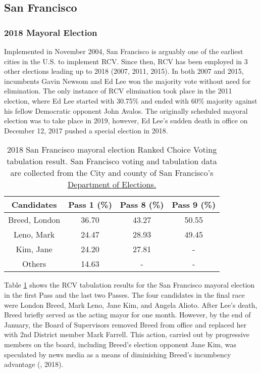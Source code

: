 \documentclass[12pt, a4paper, twoside]{article}
\begin{document}
\subsection{San Francisco}

\subsubsection{2018 Mayoral Election}

Implemented in November 2004, San Francisco is arguably one of the earliest cities in the U.S. to implement RCV. Since then, RCV has been employed in 3 other elections leading up to 2018 (2007, 2011, 2015). In both 2007 and 2015, incumbents Gavin Newsom and Ed Lee won the majority vote without need for elimination. The only instance of RCV elimination took place in the 2011 election, where Ed Lee started with 30.75\% and ended with 60\% majority against his fellow Democratic opponent John Avalos. The originally scheduled mayoral election was to take place in 2019, however, Ed Lee’s sudden death in office on December 12, 2017 pushed a special election in 2018. 

\begin{table}[h]
\centering
\begin{tabular}{|c|c|c|c|}
\hline
Candidates & Pass 1 (\%) & Pass 8 (\%) & Pass 9 (\%) \\ \hline
Breed, London & 36.70 & 43.27 & 50.55 \\ \hline
Leno, Mark & 24.47 & 28.93 & 49.45 \\ \hline
Kim, Jane & 24.20 & 27.81 & - \\ \hline
Others & 14.63 & - & - \\ \hline
\end{tabular}
\caption{2018 San Francisco mayoral election Ranked Choice Voting tabulation result. San Francisco voting and tabulation data are collected from the City and county of San Francisco's \href{https://www.sfelections.org/results/20180605/data/20180627/mayor/20180627_mayor.pdf}{Department of Elections.}}
\label{tab:7}
\end{table}

Table \ref{tab:7} shows the RCV tabulation results for the San Francisco mayoral election in the first Pass and the last two Passes. The four candidates in the final race were London Breed, Mark Leno, Jane Kim, and Angela Alioto. After Lee’s death, Breed briefly served as the acting mayor for one month. However, by the end of January, the Board of Supervisors removed Breed from office and replaced her with 2nd District member Mark Farrell. This action, carried out by progressive members on the board, including Breed’s election opponent Jane Kim, was speculated by news media as a means of diminishing Breed’s incumbency advantage (\cite{shafer2018}, 2018). 
\end{document}

